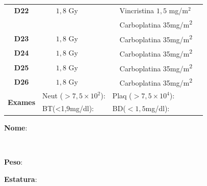 \documentclass[11pt,a4paper,oldfontcommands]{memoir}
\def\entrywithlabel[#1]#2{\parbox{#1}{{\small #2:} \hrulefill}}
\begin{document}
\begin{center}
\begin{table}[H]
\begin{tabular}{p{1cm}p{2cm}|p{2cm}|p{1cm}|p{4cm}|p{3cm}}
	\hline
	\multicolumn{1}{c|}{\multirow{1}{*}{\textbf{D22}}}&\multicolumn{1}{c|}{\(1,8\) Gy}&&&{Vincristina \(1,5\) mg/m\(^2\)}&\\
	\multicolumn{1}{c|}{\multirow{1}{*}{\textbf{}}}&\multicolumn{1}{c|}{}&&&{Carboplatina 35mg/m\textsuperscript{2}}&\\
    \multicolumn{1}{c|}{\multirow{1}{*}{\textbf{D23}}}&\multicolumn{1}{c|}{\(1,8\) Gy}&&&{Carboplatina 35mg/m\textsuperscript{2}}&\\
    \multicolumn{1}{c|}{\multirow{1}{*}{\textbf{D24}}}&\multicolumn{1}{c|}{\(1,8\) Gy}&&&{Carboplatina 35mg/m\textsuperscript{2}}&\\
    \multicolumn{1}{c|}{\multirow{1}{*}{\textbf{D25}}}&\multicolumn{1}{c|}{\(1,8\) Gy}&&&{Carboplatina 35mg/m\textsuperscript{2}}&\\
    \multicolumn{1}{c|}{\multirow{1}{*}{\textbf{D26}}}&\multicolumn{1}{c|}{\(1,8\) Gy}&&&{Carboplatina 35mg/m\textsuperscript{2}}&\\
    \hline
    \multicolumn{1}{c|}{\multirow{2}{*}{\textbf{Exames}}}&\multicolumn{2}{l|}{Neut (\(>7,5\times10^2\)):}&\multicolumn{2}{l|}{Plaq (\(>7,5\times10^4\)):}&\\
    \cline{2-6}
    \multicolumn{1}{c|}{\multirow{2}{*}{{}}}&\multicolumn{2}{l|}{BT(<1,9mg/dl):}&\multicolumn{2}{l|}{BD(\(<1,5\)mg/dl):}&
    \\
    \hline
\end{tabular}
\end{table}
\pagebreak
    \noindent
\entrywithlabel[1\hsize]{\textbf{Nome}}\hfill
\\[0.3cm]
\entrywithlabel[.45\hsize]{\textbf{Peso}}\hfill  \entrywithlabel[.45\hsize]{\textbf{Estatura}}


\end{center}
\end{document}
